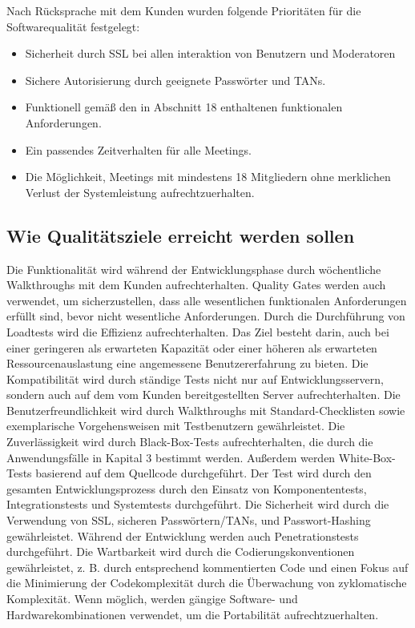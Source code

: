     Nach Rücksprache mit dem Kunden wurden folgende Prioritäten für die Softwarequalität festgelegt:

		\begin{itemize}
			\item Sicherheit durch SSL bei allen interaktion von Benutzern und Moderatoren
            \item Sichere Autorisierung durch geeignete Passwörter und TANs.
            \item Funktionell gemäß den in Abschnitt 18 enthaltenen funktionalen Anforderungen.
            \item Ein passendes Zeitverhalten für alle Meetings.
            \item Die Möglichkeit, Meetings mit mindestens 18 Mitgliedern ohne merklichen Verlust der Systemleistung aufrechtzuerhalten.

		\end{itemize}

	\subsection{Wie Qualitätsziele erreicht werden sollen}
	
	Die Funktionalität wird während der Entwicklungsphase durch wöchentliche Walkthroughs mit dem Kunden aufrechterhalten. Quality Gates werden auch verwendet, um sicherzustellen, dass alle wesentlichen funktionalen Anforderungen erfüllt sind, bevor nicht wesentliche Anforderungen.
	\linebreak
	Durch die Durchführung von Loadtests wird die Effizienz aufrechterhalten. Das Ziel besteht darin, auch bei einer geringeren als erwarteten Kapazität oder einer höheren als erwarteten Ressourcenauslastung eine angemessene Benutzererfahrung zu bieten.
	\linebreak
	Die Kompatibilität wird durch ständige Tests nicht nur auf Entwicklungsservern, sondern auch auf dem vom Kunden bereitgestellten Server aufrechterhalten.
	\linebreak
	Die Benutzerfreundlichkeit wird durch Walkthroughs mit Standard-Checklisten sowie exemplarische Vorgehensweisen mit Testbenutzern gewährleistet.
	\linebreak
	Die Zuverlässigkeit wird durch Black-Box-Tests aufrechterhalten, die durch die Anwendungsfälle in Kapital 3 bestimmt werden. Außerdem werden White-Box-Tests basierend auf dem Quellcode durchgeführt. Der Test wird durch den gesamten Entwicklungsprozess durch den Einsatz von Komponententests, Integrationstests und Systemtests durchgeführt.
	\linebreak
	Die Sicherheit wird durch die Verwendung von SSL, sicheren Passwörtern/TANs, und Passwort-Hashing gewährleistet. Während der Entwicklung werden auch Penetrationstests durchgeführt.
	\linebreak
	Die Wartbarkeit wird durch die Codierungskonventionen gewährleistet, z. B. durch entsprechend kommentierten Code und einen Fokus auf die Minimierung der Codekomplexität durch die Überwachung von zyklomatische Komplexität.
	\linebreak
	Wenn möglich, werden gängige Software- und Hardwarekombinationen verwendet, um die Portabilität aufrechtzuerhalten.
